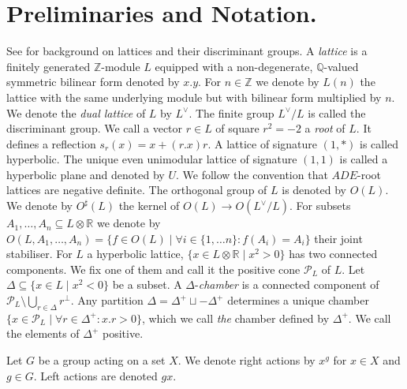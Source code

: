 \documentclass{amsart}
\theoremstyle{definition}
\theoremstyle{plain}
\newcommand{\QQ}{\mathbb{Q}}
\newcommand{\RR}{\mathbb{R}}
\newcommand{\ZZ}{\mathbb{Z}}
\renewcommand{\P}{\mathcal{P}}
\begin{document}
\section{Preliminaries and Notation.}\label{sect:preliminaries}
See \cite{nikulin} for background on lattices and their discriminant groups.
A \emph{lattice} is a finitely generated $\ZZ$-module $L$ equipped with a non-degenerate, $\QQ$-valued symmetric bilinear form denoted by $x.y$.
For $n \in \ZZ$ we denote by $L(n)$ the lattice with the same underlying module but with bilinear form multiplied by $n$.
We denote the \emph{dual lattice} of $L$ by $L^\vee$.
The finite group $L^\vee/L$ is called the discriminant group. We call a vector $r \in L$ of square $r^2=-2$ a \emph{root} of $L$. It defines a reflection $s_r(x)=x+(r.x)r$.
A lattice of signature $(1,*)$ is called hyperbolic. The unique even unimodular lattice of signature $(1,1)$ is called a hyperbolic plane and denoted by $U$.
We follow the convention that $ADE$-root lattices are negative definite.
The orthogonal group of $L$ is denoted by $O(L)$.
We denote by $O^\sharp(L)$ the kernel of $O(L)\to O(L^\vee/L)$.
For subsets $A_1, \dots, A_n \subseteq L \otimes \RR$ we denote by $O(L,A_1, \dots , A_n)=\{f \in O(L) \mid \forall i \in \{1, \dots n\}\colon f(A_i) = A_i\}$ their joint stabiliser. For $L$ a hyperbolic lattice,
$\{x \in L \otimes \RR \mid x^2>0\}$ has two connected components. We fix one of them and call it the positive cone $\P_L$ of $L$.
Let $\Delta \subseteq \{x \in L \mid x^2 <0 \}$ be a subset. A $\Delta$-\emph{chamber} is a connected component of $\mathcal{P}_L \setminus \bigcup_{r \in \Delta} r^\perp$. Any partition
$\Delta = \Delta^+ \sqcup - \Delta^+$ determines a unique chamber $\{ x \in \P_L \mid \forall r \in \Delta^+: x.r>0\}$, which we call \emph{the} chamber defined by $\Delta^+$. We call the elements of $\Delta^+$ positive.

Let $G$ be a group acting on a set $X$.
We denote right actions by $x^g$ for $x \in X$ and $g \in G$. Left actions are denoted $gx$.
\end{document}
